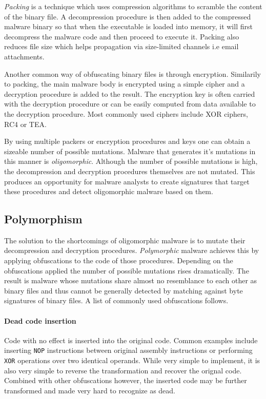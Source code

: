 \emph{Packing} is a technique which uses compression algorithms to scramble the content of the binary file\cite{Symatec08}. A decompression procedure is then added to the compressed malware binary so that when the executable is loaded into memory, it will first decompress the malware code and then proceed to execute it. Packing also reduces file size which helps propagation via size-limited channels i.e email attachments. 

Another common way of obfuscating binary files is through encryption. Similarily to packing, the main malware body is encrypted using a simple cipher and a decryption procedure is added to the result. The encryption key is often carried with the decryption procedure or can be easily computed from data available to the decryption procedure. Most commonly used ciphers include XOR ciphers, RC4 or TEA. 

By using multiple packers or encryption procedures and keys one can obtain a sizeable number of possible mutations. Malware that generates it's mutations in this manner is \emph{oligomorphic}. Although the number of possible mutations is high, the decompression and decryption procedures themselves are not mutated. This produces an opportunity for malware analysts to create signatures that target these procedures and detect oligomorphic malware based on them.

\subsection{Polymorphism}
The solution to the shortcomings of oligomorphic malware is to mutate their decompression and decryption procedures. \emph{Polymorphic} malware achieves this by applying obfuscations to the code of those procedures. Depending on the obfuscations applied the number of possible mutations rises dramatically. The result is malware whose mutations share almost no resemblance to each other as binary files and thus cannot be generally detected by matching against byte signatures of binary files. A list of commonly used obfuscations follows.

\paragraph*{Dead code insertion}
Code with no effect is inserted into the original code. Common examples include inserting \texttt{NOP} instructions between original assembly instructions or performing \texttt{XOR} operations over two identical operands. While very simple to implement, it is also very simple to reverse the transformation and recover the orignal code. Combined with other obfuscations however, the inserted code may be further transformed and made very hard to recognize as dead.


